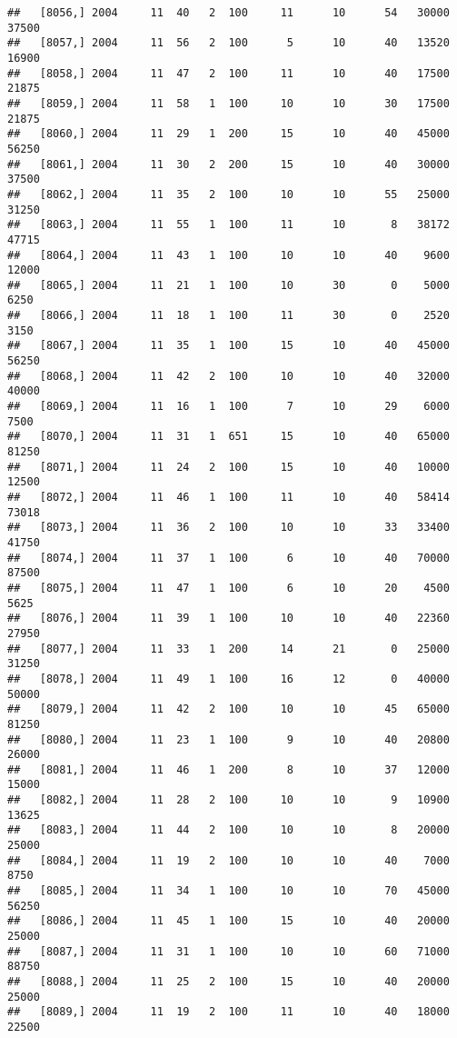 \documentclass{article}\usepackage[]{graphicx}\usepackage[]{color}
\makeatletter
\newenvironment{kframe}{%
 \def\at@end@of@kframe{}%
 \ifinner\ifhmode%
  \def\at@end@of@kframe{\end{minipage}}%
  \begin{minipage}{\columnwidth}%
 \fi\fi%
 \def\FrameCommand##1{\hskip\@totalleftmargin \hskip-\fboxsep
 \colorbox{shadecolor}{##1}\hskip-\fboxsep
     \hskip-\linewidth \hskip-\@totalleftmargin \hskip\columnwidth}%
 \MakeFramed {\advance\hsize-\width
   \@totalleftmargin\z@ \linewidth\hsize
   \@setminipage}}%
 {\par\unskip\endMakeFramed%
 \at@end@of@kframe}
\newenvironment{knitrout}{}{} %
\makeatother
\begin{document}
\begin{knitrout}
\begin{kframe}
\begin{verbatim}
##   [8056,] 2004     11  40   2  100     11      10      54   30000   37500
##   [8057,] 2004     11  56   2  100      5      10      40   13520   16900
##   [8058,] 2004     11  47   2  100     11      10      40   17500   21875
##   [8059,] 2004     11  58   1  100     10      10      30   17500   21875
##   [8060,] 2004     11  29   1  200     15      10      40   45000   56250
##   [8061,] 2004     11  30   2  200     15      10      40   30000   37500
##   [8062,] 2004     11  35   2  100     10      10      55   25000   31250
##   [8063,] 2004     11  55   1  100     11      10       8   38172   47715
##   [8064,] 2004     11  43   1  100     10      10      40    9600   12000
##   [8065,] 2004     11  21   1  100     10      30       0    5000    6250
##   [8066,] 2004     11  18   1  100     11      30       0    2520    3150
##   [8067,] 2004     11  35   1  100     15      10      40   45000   56250
##   [8068,] 2004     11  42   2  100     10      10      40   32000   40000
##   [8069,] 2004     11  16   1  100      7      10      29    6000    7500
##   [8070,] 2004     11  31   1  651     15      10      40   65000   81250
##   [8071,] 2004     11  24   2  100     15      10      40   10000   12500
##   [8072,] 2004     11  46   1  100     11      10      40   58414   73018
##   [8073,] 2004     11  36   2  100     10      10      33   33400   41750
##   [8074,] 2004     11  37   1  100      6      10      40   70000   87500
##   [8075,] 2004     11  47   1  100      6      10      20    4500    5625
##   [8076,] 2004     11  39   1  100     10      10      40   22360   27950
##   [8077,] 2004     11  33   1  200     14      21       0   25000   31250
##   [8078,] 2004     11  49   1  100     16      12       0   40000   50000
##   [8079,] 2004     11  42   2  100     10      10      45   65000   81250
##   [8080,] 2004     11  23   1  100      9      10      40   20800   26000
##   [8081,] 2004     11  46   1  200      8      10      37   12000   15000
##   [8082,] 2004     11  28   2  100     10      10       9   10900   13625
##   [8083,] 2004     11  44   2  100     10      10       8   20000   25000
##   [8084,] 2004     11  19   2  100     10      10      40    7000    8750
##   [8085,] 2004     11  34   1  100     10      10      70   45000   56250
##   [8086,] 2004     11  45   1  100     15      10      40   20000   25000
##   [8087,] 2004     11  31   1  100     10      10      60   71000   88750
##   [8088,] 2004     11  25   2  100     15      10      40   20000   25000
##   [8089,] 2004     11  19   2  100     11      10      40   18000   22500

\end{verbatim}
\end{kframe}
\end{knitrout}
\end{document}
